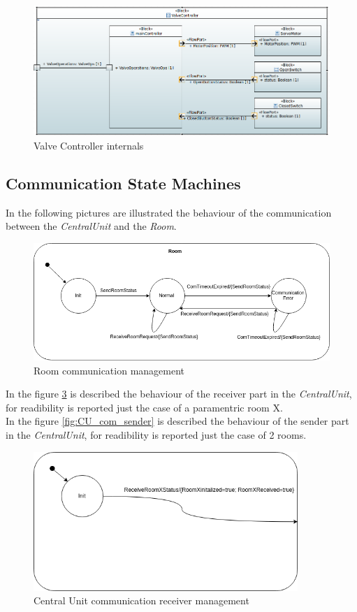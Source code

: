 \begin{figure}[H]
	\centering
	\includegraphics[width=12cm,keepaspectratio]{img/sysml/ValveControllerInternals}
	\caption{Valve Controller internals}
	\label{fig:valve_internals}
\end{figure}

\subsection{Communication State Machines}
In the following pictures are illustrated the behaviour of the communication between the \textit{CentralUnit} and the \textit{Room}.

\begin{figure}[H]
	\centering
	\includegraphics[width=12cm,keepaspectratio]{img/Com_SM_Room}
	\caption{Room communication management}
	\label{fig:room_com}
\end{figure}

In the figure \ref{fig:CU_com_receiver} is described the behaviour of the receiver part in the \textit{CentralUnit}, for readibility is reported just the case of a paramentric room X.\\

In the figure \ref{fig:CU_com_sender} is described the behaviour of the sender part in the \textit{CentralUnit}, for readibility is reported just the case of 2 rooms.

\begin{figure}[H]
	\centering
	\includegraphics[width=10cm,keepaspectratio]{img/Com_SM_CU_Receiver}
	\caption{Central Unit communication receiver management}
	\label{fig:CU_com_receiver}
\end{figure}


